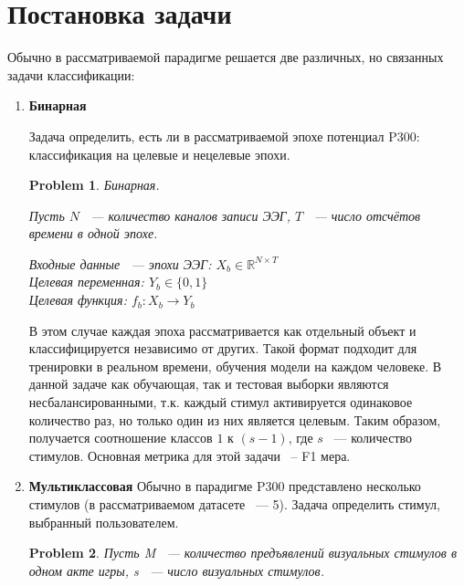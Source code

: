 \documentclass[12pt]{article}
\newcommand{\R}{\mathbb{R}}
\newtheorem{problem}{Problem}
\begin{document}
	
	
	
	
	
	\newpage
	\section{Постановка задачи}
	
	Обычно в рассматриваемой парадигме решается две различных, но связанных задачи классификации:
	
	\begin{enumerate}
		\item \textbf{Бинарная}
		
		Задача определить, есть ли в рассматриваемой эпохе потенциал P300: классификация на целевые и нецелевые эпохи. 
		\begin{problem}
			Бинарная.
			
			Пусть $N$ ~---  количество каналов записи ЭЭГ, $T$ ~---  число отсчётов времени в одной эпохе.
			
			Входные данные ~--- 
			эпохи ЭЭГ: $X_b \in \R^{N \times T}$\\
			Целевая переменная: $ Y_b \in \{0, 1\} $\\
			Целевая функция: $ f_b: X_b \to Y_b$
		\end{problem}
		В этом случае каждая эпоха рассматривается как отдельный объект и классифицируется независимо от других. Такой формат подходит для тренировки в реальном времени, обучения модели на каждом человеке. В данной задаче как обучающая, так и тестовая выборки являются несбалансированными, т.к. каждый стимул активируется одинаковое количество раз, но только один из них является целевым. Таким образом, получается соотношение классов  $1$ к $(s-1)$, где $s$ ~--- количество стимулов.
		Основная метрика для этой задачи ~-- F1 мера. 
		
		\item \textbf{Мультиклассовая}
		Обычно в парадигме P300 представлено несколько стимулов (в рассматриваемом датасете ~--- 5). Задача определить стимул, выбранный пользователем. 
		\begin{problem}
			Пусть M ~--- количество предъявлений визуальных стимулов в одном акте игры, s ~--- число визуальных стимулов.
			

\end{problem}
\end{enumerate}
\end{document}
